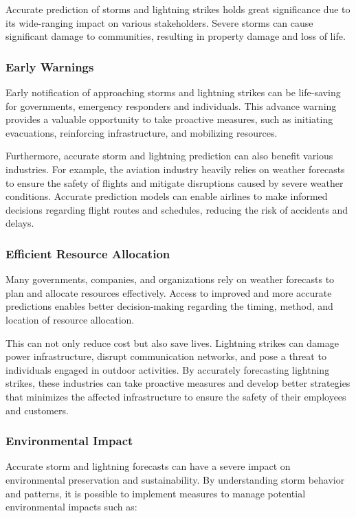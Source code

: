 Accurate prediction of storms and lightning strikes holds great significance due to its wide-ranging impact on various stakeholders. Severe storms can cause significant damage to communities, resulting in property damage and loss of life.

\subsubsection{Early Warnings}

Early notification of approaching storms and lightning strikes can be life-saving for governments, emergency responders and individuals. This advance warning provides a valuable opportunity to take proactive measures, such as initiating evacuations, reinforcing infrastructure, and mobilizing resources.

Furthermore, accurate storm and lightning prediction can also benefit various industries. For example, the aviation industry heavily relies on weather forecasts to ensure the safety of flights and mitigate disruptions caused by severe weather conditions. Accurate prediction models can enable airlines to make informed decisions regarding flight routes and schedules, reducing the risk of accidents and delays.

\subsubsection{Efficient Resource Allocation}

Many governments, companies, and organizations rely on weather forecasts to plan and allocate resources effectively. Access to improved and more accurate predictions enables better decision-making regarding the timing, method, and location of resource allocation.

This can not only reduce cost but also save lives. Lightning strikes can damage power infrastructure, disrupt communication networks, and pose a threat to individuals engaged in outdoor activities. By accurately forecasting lightning strikes, these industries can take proactive measures and develop better strategies that minimizes the affected infrastructure to ensure the safety of their employees and customers.

\subsubsection{Environmental Impact}

Accurate storm and lightning forecasts can have a severe impact on environmental preservation and sustainability. By understanding storm behavior and patterns, it is possible to implement measures to manage potential environmental impacts such as:

